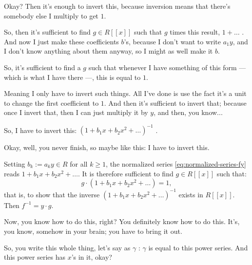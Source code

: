 \begin{proofWrapper}
\begin{speech}[00:39:07 - 00:40:25]
Okay? Then it's enough to invert this, because inversion means that there's somebody else I multiply to get $1$.

So, then it's sufficient to find $g \in R[[x]]$  such that $g$ times this result, $1 + \dots$ . And now I just make these coefficients $b$'s, because I don't want to write $a_1 y$, and I don't know anything about them anyway, so I might as well make it $b$.

So, it's sufficient to find a $g$ such that whenever I have something of this form --- which is what I have there ---, this is equal to $1$.

Meaning I only have to invert such things. All I've done is use the fact it's a unit to change the first coefficient to $1$. And then it's sufficient to invert that; because once I invert that, then I can just multiply it by $y$, and then, you know...

So, I have to invert this: $(1 + b_1 x + b_2 x^2 + \dots)^{-1}$ .

Okay, well, you never finish, so maybe like this: I have to invert this.
\end{speech}

\begin{content}
Setting $b_k := a_k y \in R$ for all $k \ge 1$, the normalized series \eqref{eq:normalized-series-fy} reads $1 + b_1 x + b_2 x^2 + \dots$. It is therefore sufficient to find $g \in R[[x]]$ such that:
\begin{equation}\label{eq:one-plus-b-series}
g \cdot (1 + b_1 x + b_2 x^2 + \dots) = 1,
\end{equation}
that is, to show that the inverse $(1 + b_1 x + b_2 x^2 + \dots)^{-1}$ exists in $R[[x]]$. Then $f^{-1} = y \cdot g$.
\end{content}

\begin{speech}[00:40:25 - 00:41:31]
Now, you know how to do this, right? You definitely know how to do this. It's, you know, somehow in your brain; you have to bring it out.

So, you write this whole thing, let's say as $\gamma$ : $\gamma$ is equal to this power series. And this power series has $x$'s in it, okay?


\end{speech}
\end{proofWrapper}
